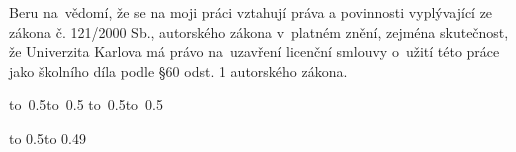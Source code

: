 \medskip\noindent
Beru na~vědomí, že se na moji práci vztahují práva a povinnosti vyplývající
ze zákona č. 121/2000 Sb., autorského zákona v~platném znění, zejména skutečnost,
že Univerzita Karlova má právo na~uzavření licenční smlouvy o~užití této
práce jako školního díla podle §60 odst. 1 autorského zákona.

\vspace{10mm}

\hbox{\hbox to 0.5\hbox to 0.5\hsize{\dotfill\quad}}
\smallskip
\hbox{\hbox to 0.5\hsize{}\hbox to 0.5}

\vspace{20mm}
\newpage


\openright

\noindent
\Podekovani

\newpage


\openright

\vbox to 0.5\nobreak\vbox to 0.49

\newpage

\openright
\pagestyle{plain}
\setcounter{page}{1}
